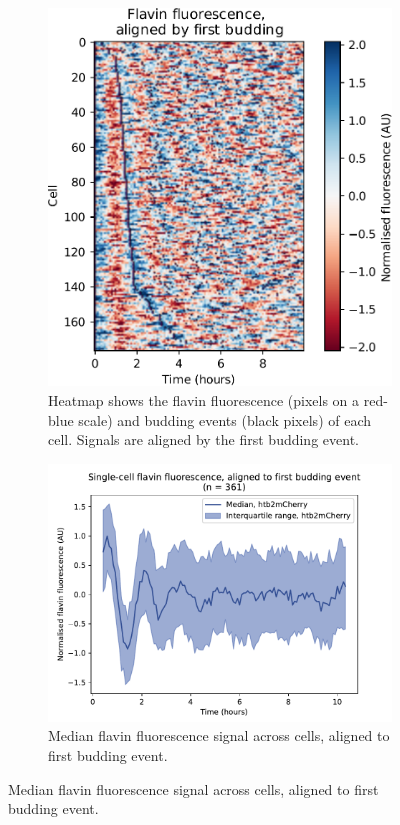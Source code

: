 \begin{figure}
  \begin{subfigure}[htpb]{0.4\textwidth}
   \centering
   \includegraphics[width=\textwidth]{heatmap_edit.pdf}
   \caption{
     Heatmap shows the flavin fluorescence (pixels on a red-blue scale) and budding events (black pixels) of each cell.
     Signals are aligned by the first budding event.
   }
   \label{fig:biology-highglc-sync-heatmap}
  \end{subfigure}%
  \begin{subfigure}[htpb]{0.4\textwidth}
   \centering
   \includegraphics[width=\textwidth]{htb2mCherry_26643_6}
   \caption{
    Median flavin fluorescence signal across cells, aligned to first budding event.
   }
   \label{fig:biology-highglc-sync-median}
  \end{subfigure}


\end{figure}
